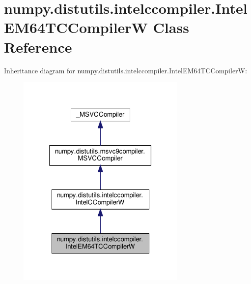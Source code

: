 \hypertarget{classnumpy_1_1distutils_1_1intelccompiler_1_1IntelEM64TCCompilerW}{}\section{numpy.\+distutils.\+intelccompiler.\+Intel\+E\+M64\+T\+C\+CompilerW Class Reference}
\label{classnumpy_1_1distutils_1_1intelccompiler_1_1IntelEM64TCCompilerW}


Inheritance diagram for numpy.\+distutils.\+intelccompiler.\+Intel\+E\+M64\+T\+C\+CompilerW\+:
\nopagebreak
\begin{figure}[H]
\begin{center}
\leavevmode
\includegraphics[width=235pt]{classnumpy_1_1distutils_1_1intelccompiler_1_1IntelEM64TCCompilerW__inherit__graph}
\end{center}
\end{figure}


